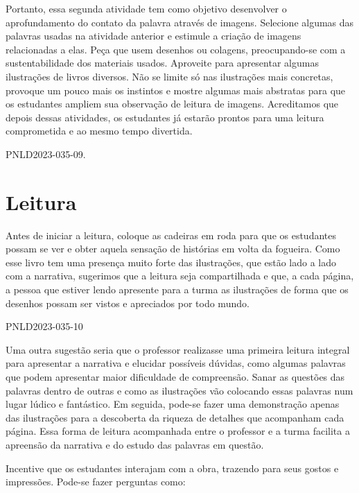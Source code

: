 \documentclass[11pt]{extarticle}
\begin{document}
Portanto, essa segunda atividade tem como objetivo desenvolver o aprofundamento do contato da palavra através de imagens. Selecione algumas das palavras usadas na atividade anterior e estimule a criação de imagens relacionadas a elas. Peça que usem desenhos ou colagens, preocupando-se com a sustentabilidade dos materiais usados. Aproveite para apresentar algumas ilustrações de livros diversos. Não se limite só nas ilustrações mais concretas, provoque um pouco mais os instintos e mostre algumas mais abstratas para que os estudantes ampliem sua observação de leitura de imagens. Acreditamos que depois dessas atividades, os estudantes já estarão prontos para uma leitura comprometida e ao mesmo tempo divertida. 

PNLD2023-035-09.


\section{Leitura}


Antes de iniciar a leitura, coloque as cadeiras em roda para que os estudantes possam se ver e obter aquela sensação de histórias em volta da fogueira. Como esse livro tem uma presença muito forte das ilustrações, que estão lado a lado com a narrativa, sugerimos que a leitura seja compartilhada e que, a cada página, a pessoa que estiver lendo apresente para a turma as ilustrações de forma que os desenhos possam ser vistos e apreciados por todo mundo. 

PNLD2023-035-10

Uma outra sugestão seria que o professor realizasse uma primeira leitura integral para apresentar a narrativa e elucidar possíveis dúvidas, como algumas palavras que podem apresentar maior dificuldade de compreensão. Sanar as questões das palavras dentro de outras e como as ilustrações vão colocando essas palavras num lugar lúdico e fantástico. Em seguida, pode-se fazer uma demonstração apenas das ilustrações para a descoberta da riqueza de detalhes que acompanham cada página. Essa forma de leitura acompanhada entre o professor e a turma facilita a apreensão da narrativa e do estudo das palavras em questão.


Incentive que os estudantes interajam com a obra, trazendo para seus gostos e impressões. Pode-se fazer perguntas como:
\end{document}
